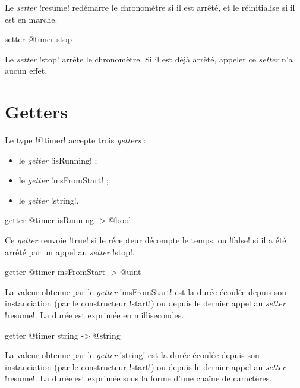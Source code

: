Le \emph{setter} \ggst!resume! redémarre le chronomètre si il est arrêté, et le réinitialise si il est en marche.

\begin{galgas3box}
setter @timer stop
\end{galgas3box}

Le \emph{setter} \ggst!stop! arrête le chronomètre. Si il est déjà arrêté, appeler ce \emph{setter} n'a aucun effet.







\section{Getters}

Le type \ggst!@timer! accepte trois \emph{getters} :
\begin{itemize}
  \item le \emph{getter} \ggst!isRunning! ;
  \item le \emph{getter} \ggst!msFromStart! ;
  \item le \emph{getter} \ggst!string!.
\end{itemize}


\begin{galgas3box}
getter @timer isRunning -> @bool
\end{galgas3box}

Ce \emph{getter} renvoie  \ggst!true! si le récepteur décompte le temps, ou \ggst!false! si il a été arrêté par un appel au \emph{setter} \ggst!stop!.



\begin{galgas3box}
getter @timer msFromStart -> @uint
\end{galgas3box}

La valeur obtenue par le \emph{getter} \ggst!msFromStart! est la durée écoulée depuis son instanciation (par le constructeur \ggst!start!) ou depuis le dernier appel au \emph{setter} \ggst!resume!. La durée est exprimée en millisecondes.



\begin{galgas3box}
getter @timer string -> @string
\end{galgas3box}

La valeur obtenue par le \emph{getter} \ggst!string! est la durée écoulée depuis son instanciation (par le constructeur \ggst!start!) ou depuis le dernier appel au \emph{setter} \ggst!resume!. La durée est exprimée sous la forme d'une chaîne de caractères.

